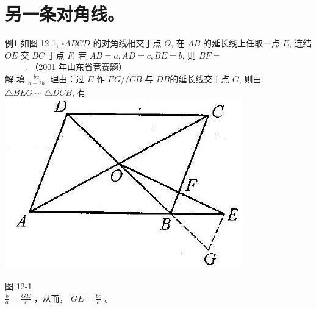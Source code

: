 \documentclass[10pt]{article}
\begin{document}
\section*{另一条对角线。}
例1 如图 12-1, $\square A B C D$ 的对角线相交于点 $O$, 在 $A B$ 的延长线上任取一点 $E$, 连结 $O E$ 交 $B C$ 于点 $F$, 若 $A B=a, A D=c, B E=b$, 则 $B F=$\\
$\qquad$ . （2001 年山东省竞赛题）\\
解 填 $\frac{b c}{a+2 b}$. 理由：过 $E$ 作 $E G / / C B$ 与 $D B$的延长线交于点 $G$, 则由 $\triangle B E G \backsim \triangle D C B$, 有\\
\includegraphics[max width=\textwidth, center]{2024_10_30_2c8f45efd4a519b08e1ag-110(1)}

图 12-1\\
$\frac{b}{a}=\frac{G E}{c}$ ，从而， $G E=\frac{b c}{a}$ 。
\end{document}
